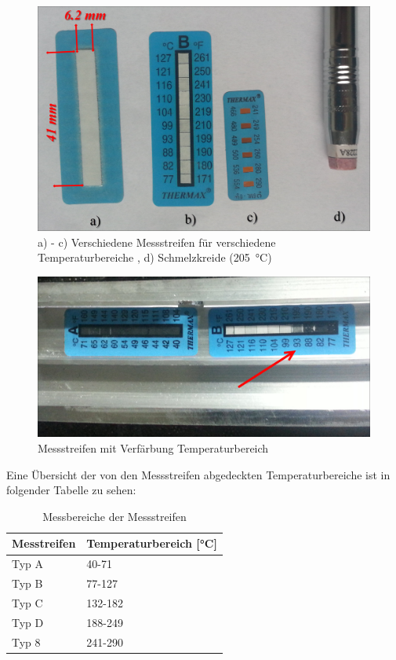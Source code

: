 \documentclass[12pt,a4paper,parskip]{scrartcl}
\begin{document}
\begin{figure}[H]
\centering
\includegraphics[width=.8\textwidth]{messstreifen}
\caption{a) - c) Verschiedene Messstreifen für verschiedene Temperaturbereiche , d) Schmelzkreide (\SI{205}{\degreeCelsius}) }
\label{fig:messstreifen}
\end{figure}
\begin{figure}[H]
\centering
\includegraphics[width=.8\textwidth]{messaction}
\caption{Messstreifen mit Verfärbung Temperaturbereich}
\label{fig:messaction}
\end{figure}

Eine Übersicht der von den  Messstreifen abgedeckten Temperaturbereiche ist in folgender Tabelle zu sehen:

\begin{table}[H]
\caption{Messbereiche der Messstreifen}
\label{tab:messbereiche}
\centering
\begin{tabular}{ll}
\toprule
Messtreifen  & Temperaturbereich [\si{\degreeCelsius}]\\
\midrule
Typ A & 40-71\\
Typ B & 77-127\\
Typ C & 132-182\\
Typ D & 188-249\\
Typ 8 & 241-290\\
\bottomrule
\end{tabular}
\end{table}
\end{document}

